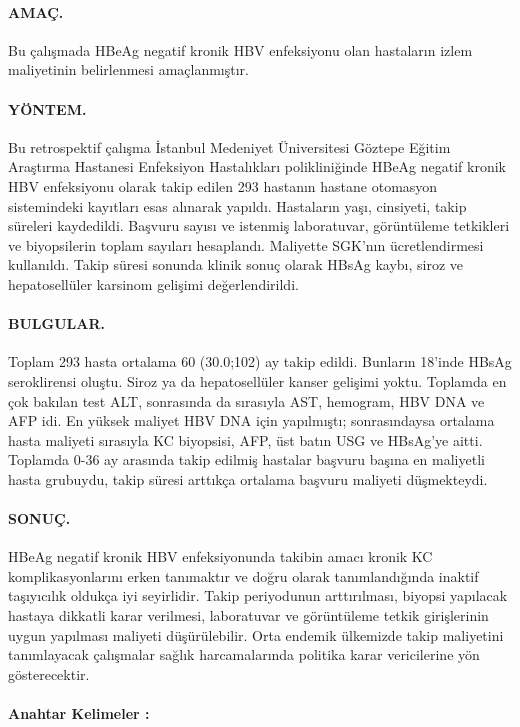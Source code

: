 


\paragraph*{AMAÇ. } Bu çalışmada HBeAg negatif kronik HBV enfeksiyonu olan hastaların izlem maliyetinin belirlenmesi amaçlanmıştır.

\paragraph*{YÖNTEM. } Bu retrospektif çalışma İstanbul Medeniyet Üniversitesi Göztepe Eğitim Araştırma Hastanesi Enfeksiyon Hastalıkları polikliniğinde HBeAg negatif kronik HBV enfeksiyonu olarak takip edilen 293 hastanın hastane otomasyon sistemindeki kayıtları esas alınarak yapıldı. Hastaların yaşı, cinsiyeti, takip süreleri kaydedildi. Başvuru sayısı ve istenmiş laboratuvar, görüntüleme tetkikleri ve biyopsilerin toplam sayıları hesaplandı. Maliyette SGK'nın ücretlendirmesi kullanıldı. Takip süresi sonunda klinik sonuç olarak HBsAg kaybı, siroz ve hepatosellüler karsinom gelişimi değerlendirildi. 



\paragraph*{BULGULAR. } Toplam 293 hasta ortalama 60 (30.0;102) ay takip edildi. Bunların 18'inde HBsAg seroklirensi oluştu. Siroz ya da hepatosellüler kanser gelişimi yoktu.  Toplamda en çok bakılan test ALT, sonrasında da sırasıyla AST, hemogram, HBV DNA ve AFP idi. En yüksek maliyet HBV DNA için yapılmıştı; sonrasındaysa ortalama hasta maliyeti sırasıyla KC biyopsisi, AFP, üst batın USG ve HBsAg'ye aitti. Toplamda 0-36 ay arasında takip edilmiş hastalar başvuru başına en maliyetli hasta grubuydu, takip süresi arttıkça ortalama başvuru maliyeti düşmekteydi.


\paragraph*{SONUÇ. } HBeAg negatif kronik HBV enfeksiyonunda takibin amacı kronik KC komplikasyonlarını erken tanımaktır ve doğru olarak tanımlandığında inaktif taşıyıcılık oldukça iyi seyirlidir. Takip periyodunun arttırılması, biyopsi yapılacak hastaya dikkatli karar verilmesi, laboratuvar ve görüntüleme tetkik girişlerinin uygun yapılması maliyeti düşürülebilir. Orta endemik ülkemizde takip maliyetini tanımlayacak çalışmalar sağlık harcamalarında politika karar vericilerine yön gösterecektir. 


\paragraph*{Anahtar Kelimeler :} \keywordnames
\cleardoublepage 
{}

